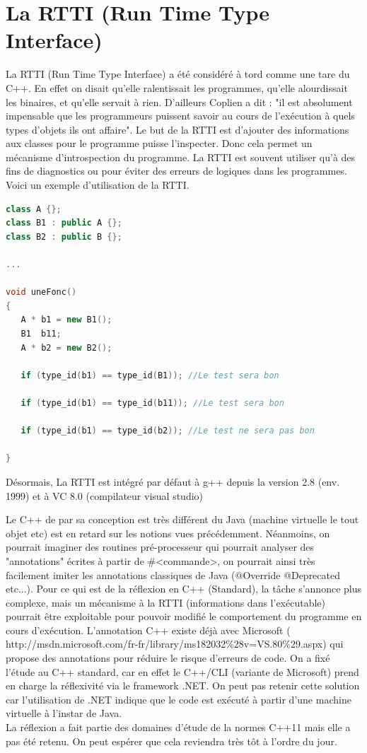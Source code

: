 \documentclass[a4paper,11pt]{report}
\begin{document}
{{{{\section{La RTTI (Run Time Type Interface)}

\normalsize{
La RTTI (Run Time Type Interface) a été considéré à tord comme une tare du C++. En effet on disait qu'elle ralentissait les programmes, qu'elle alourdissait les binaires, et qu'elle servait à rien. D'ailleurs Coplien a dit : "il est absolument impensable que les programmeurs puissent savoir au cours de l'exécution à quels types d'objets ils ont affaire". Le but de la RTTI est d'ajouter des informations aux classes pour le programme puisse l'inspecter. Donc cela permet un mécanisme d'introspection du programme. La RTTI est souvent utiliser qu'à des fins de diagnostics ou pour éviter des erreurs de logiques dans les programmes. Voici un exemple d'utilisation de la RTTI.
}


\begin{lstlisting}[language=C++]
class A {};
class B1 : public A {};
class B2 : public B {};

...

void uneFonc()
{
   A * b1 = new B1();
   B1  b11;
   A * b2 = new B2();

   if (type_id(b1) == type_id(B1)); //Le test sera bon

   if (type_id(b1) == type_id(b11)); //Le test sera bon

   if (type_id(b1) == type_id(b2)); //Le test ne sera pas bon
	   
}
\end{lstlisting}

\normalsize{
Désormais, La RTTI est intégré par défaut à g++ depuis la version 2.8 (env. 1999) et à VC 8.0 (compilateur visual studio) 
}

\normalsize{
Le C++ de par sa conception est très différent du Java (machine virtuelle le tout objet etc) est en retard sur les notions vues précédemment. Néanmoins, on pourrait imaginer des routines pré-processeur qui pourrait analyser des "annotations" écrites à partir de \#<commande>, on pourrait ainsi très facilement imiter les annotations classiques de Java (@Override @Deprecated etc...). Pour ce qui est de la réflexion en C++ (Standard), la tâche s'annonce plus complexe, mais un mécanisme à la RTTI (informations dans l'exécutable) pourrait être exploitable pour pouvoir modifié le comportement du programme en cours d'exécution. L'annotation C++ existe déjà avec Microsoft ( http://msdn.microsoft.com/fr-fr/library/ms182032\%28v=VS.80\%29.aspx) qui propose des annotations pour réduire le risque d'erreurs de code. On a fixé l'étude au C++ standard, car en effet le C++/CLI (variante de Microsoft) prend en charge la réflexivité via le framework .NET. On peut pas retenir cette solution car l'utilisation de .NET indique que le code est exécuté à partir d'une machine virtuelle à l'instar de Java. \\
La réflexion a fait partie des domaines d'étude de la normes C++11 mais elle a pas été retenu. On peut espérer que cela reviendra très tôt à l'ordre du jour. 
}

}}}}
\end{document}
